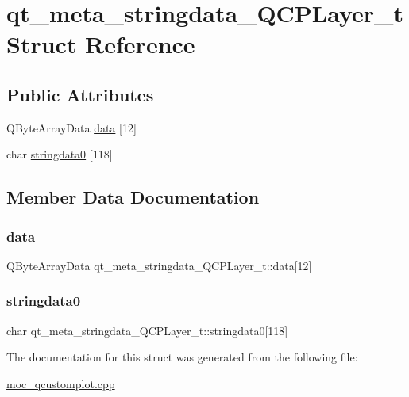 \hypertarget{structqt__meta__stringdata__QCPLayer__t}{}\section{qt\+\_\+meta\+\_\+stringdata\+\_\+\+Q\+C\+P\+Layer\+\_\+t Struct Reference}
\label{structqt__meta__stringdata__QCPLayer__t}
\subsection*{Public Attributes}
\begin{DoxyCompactItemize}
\item 
Q\+Byte\+Array\+Data \mbox{\hyperlink{structqt__meta__stringdata__QCPLayer__t_a8c36428e0f14ee3bf9fb37ad1719be47}{data}} \mbox{[}12\mbox{]}
\item 
char \mbox{\hyperlink{structqt__meta__stringdata__QCPLayer__t_a823b98e98042cc0f3c0c9b73fcd0f226}{stringdata0}} \mbox{[}118\mbox{]}
\end{DoxyCompactItemize}


\subsection{Member Data Documentation}
\mbox{\label{structqt__meta__stringdata__QCPLayer__t_a8c36428e0f14ee3bf9fb37ad1719be47}} 
\subsubsection{\texorpdfstring{data}{data}}
{\footnotesize\ttfamily Q\+Byte\+Array\+Data qt\+\_\+meta\+\_\+stringdata\+\_\+\+Q\+C\+P\+Layer\+\_\+t\+::data\mbox{[}12\mbox{]}}

\mbox{\label{structqt__meta__stringdata__QCPLayer__t_a823b98e98042cc0f3c0c9b73fcd0f226}} 
\subsubsection{\texorpdfstring{stringdata0}{stringdata0}}
{\footnotesize\ttfamily char qt\+\_\+meta\+\_\+stringdata\+\_\+\+Q\+C\+P\+Layer\+\_\+t\+::stringdata0\mbox{[}118\mbox{]}}



The documentation for this struct was generated from the following file\+:\begin{DoxyCompactItemize}
\item 
\mbox{\hyperlink{moc__qcustomplot_8cpp}{moc\+\_\+qcustomplot.\+cpp}}\end{DoxyCompactItemize}
